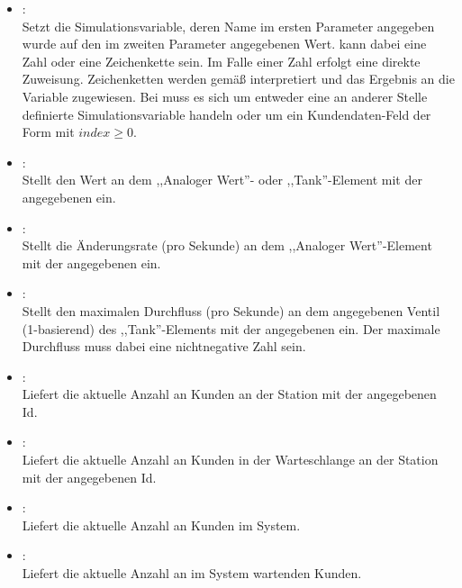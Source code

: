 \begin{itemize}

\item
{}:\\
Setzt die Simulationsvariable, deren Name im ersten Parameter angegeben wurde auf den im zweiten Parameter angegebenen Wert.
 kann dabei eine Zahl oder eine Zeichenkette sein. Im Falle einer Zahl erfolgt eine direkte Zuweisung.
Zeichenketten werden gemäß  interpretiert und das Ergebnis an die Variable zugewiesen. Bei 
muss es sich um entweder eine an anderer Stelle definierte Simulationsvariable handeln oder um ein Kundendaten-Feld der Form
 mit $index\ge0$.

\item
{}:\\
Stellt den Wert an dem ,,Analoger Wert''- oder ,,Tank''-Element mit der angegebenen  ein.
  
\item
{}:\\
Stellt die Änderungsrate (pro Sekunde) an dem ,,Analoger Wert''-Element mit der angegebenen  ein.
  
\item
{}:\\
Stellt den maximalen Durchfluss (pro Sekunde) an dem angegebenen Ventil (1-basierend) des ,,Tank''-Elements mit der angegebenen  ein.
Der maximale Durchfluss muss dabei eine nichtnegative Zahl sein. 

\item
{}:\\
Liefert die aktuelle Anzahl an Kunden an der Station mit der angegebenen Id.
  
\item
{}:\\
Liefert die aktuelle Anzahl an Kunden in der Warteschlange an der Station mit der angegebenen Id.

\item
{}:\\
Liefert die aktuelle Anzahl an Kunden im System.
  
\item
{}:\\
Liefert die aktuelle Anzahl an im System wartenden Kunden.

\end{itemize}

